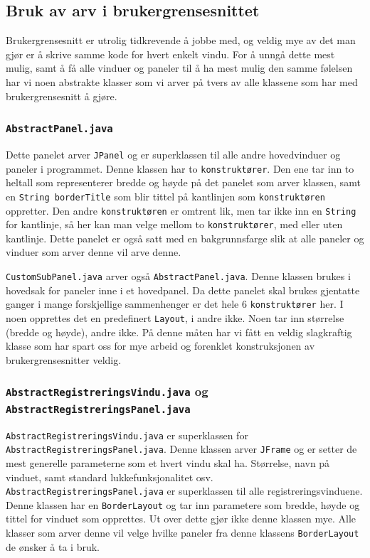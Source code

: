 \subsection{Bruk av arv i brukergrensesnittet}
Brukergrensesnitt er utrolig tidkrevende å jobbe med, og veldig mye av det man gjør er å skrive samme kode for hvert enkelt vindu.
For å unngå dette mest mulig, samt å få alle vinduer og paneler til å ha mest mulig den samme følelsen har vi noen abstrakte klasser som vi arver på tvers av alle klassene som har med brukergrensesnitt å gjøre.


\subsubsection*{\texttt{AbstractPanel.java}}
Dette panelet arver \texttt{JPanel} og er superklassen til alle andre hovedvinduer og paneler i programmet.
Denne klassen har to \texttt{konstruktører}. Den ene tar inn to heltall som representerer bredde og høyde på det panelet som arver klassen, samt en \texttt{String borderTitle} som blir tittel på kantlinjen som \texttt{konstruktøren} oppretter.
Den andre \texttt{konstruktøren} er omtrent lik, men tar ikke inn en \texttt{String} for kantlinje, så her kan man velge mellom to \texttt{konstruktører}, med eller uten kantlinje.
Dette panelet er også satt med en bakgrunnsfarge slik at alle paneler og vinduer som arver denne vil arve denne.

\texttt{CustomSubPanel.java} arver også \texttt{AbstractPanel.java}. Denne klassen brukes i hovedsak for paneler inne i et hovedpanel. Da dette panelet skal brukes gjentatte ganger i mange forskjellige sammenhenger er det hele 6 \texttt{konstruktører} her. 
I noen opprettes det en predefinert \texttt{Layout}, i andre ikke. Noen tar inn størrelse (bredde og høyde), andre ikke. På denne måten har vi fått en veldig slagkraftig klasse som har spart oss for mye arbeid og forenklet konstruksjonen av brukergrensesnitter veldig.


\subsubsection*{\texttt{AbstractRegistreringsVindu.java} og \texttt{AbstractRegistreringsPanel.java}}
\texttt{AbstractRegistreringsVindu.java} er superklassen for \texttt{AbstractRegistreringsPanel.java}. Denne klassen arver \texttt{JFrame} og er setter de mest generelle parameterne som et hvert vindu skal ha. Størrelse, navn på vinduet, samt standard lukkefunksjonalitet osv.
\texttt{AbstractRegistreringsPanel.java} er superklassen til alle registreringsvinduene. Denne klassen har en \texttt{BorderLayout} og tar inn parametere som bredde, høyde og tittel for vinduet som opprettes. Ut over dette gjør ikke denne klassen mye. Alle klasser som arver denne vil velge hvilke paneler fra denne klassens \texttt{BorderLayout} de ønsker å ta i bruk.


